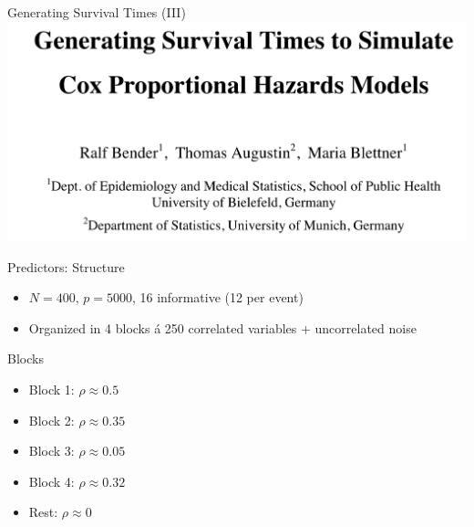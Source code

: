 \documentclass{beamer}
\providecommand{\tightlist}{%
  \setlength{\itemsep}{0pt}\setlength{\parskip}{0pt}}
\begin{document}
\begin{frame}{Generating Survival Times (III)}
\protect\hypertarget{generating-survival-times-iii}{}
\includegraphics[width=0.95\linewidth]{img/bender2003}

\textcite{bender2005generatingsurvival}
\end{frame}

\begin{frame}{Predictors: Structure}
\protect\hypertarget{predictors-structure}{}
\begin{itemize}
\tightlist
\item
  \(N = 400\), \(p = 5000\), 16 informative (12 per event)
\item
  Organized in 4 blocks á 250 correlated variables + uncorrelated noise
\end{itemize}

\begin{block}{Blocks}
\protect\hypertarget{blocks}{}
\begin{itemize}
\tightlist
\item
  Block 1: \(\rho \approx 0.5\)
\item
  Block 2: \(\rho \approx 0.35\)
\item
  Block 3: \(\rho \approx 0.05\)
\item
  Block 4: \(\rho \approx 0.32\)
\item
  Rest: \(\rho \approx 0\)
\end{itemize}
\end{block}
\end{frame}
\end{document}

